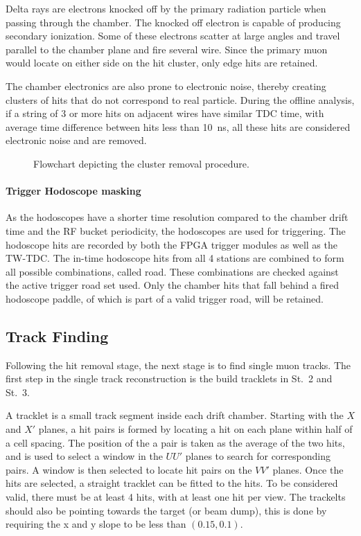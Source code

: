 \documentclass[../main.tex]{subfiles}
\begin{document}
Delta rays are electrons knocked off by the primary radiation particle when passing
through the chamber. The knocked off electron is capable of producing secondary ionization.
Some of these electrons scatter at large angles and travel parallel to the chamber plane
and fire several wire. Since the primary muon would locate on either side on the hit cluster,
only edge hits are retained.

The chamber electronics are also prone to electronic noise, thereby creating clusters of
hits that do not correspond to real particle. During the offline analysis, if a string of
3 or more hits on adjacent wires have similar TDC time, with average time difference between
hits less than \SI{10}{\ns}, all these hits are considered electronic noise and are removed.

\begin{figure}
	\centering
	
	\caption{Flowchart depicting the cluster removal procedure.}
\end{figure}

\paragraph{Trigger Hodoscope masking}
As the hodoscopes have a shorter time resolution compared to the chamber drift time and
the RF bucket periodicity, the hodoscopes are used for triggering. The hodoscope hits
are recorded by both the FPGA trigger modules as well as the TW-TDC. The in-time hodoscope
hits from all 4 stations are combined to form all possible combinations, called road. These
combinations are checked against the active trigger road set used. Only the chamber hits
that fall behind a fired hodoscope paddle, of which is part of a valid trigger road, will be retained.


\subsection{Track Finding}
Following the hit removal stage, the next stage is to find single muon tracks.
The first step in the single track reconstruction is the build tracklets in St.~2 and St.~3.

A tracklet is a small track segment inside each drift chamber. Starting with the $X$ and
$X'$ planes, a hit pairs is formed by locating a hit on each plane within half of a cell spacing.
The position of the a pair is taken as the average of the two hits, and is used to select a window
in the $UU'$ planes to search for corresponding pairs. A window is then selected to locate hit pairs
on the $VV'$ planes. Once the hits are selected, a straight tracklet can be fitted to the hits.
To be considered valid, there must be at least 4 hits, with at least one hit per view. The trackelts
should also be pointing towards the target (or beam dump), this is done by requiring the x and y slope to be
less than $(0.15,0.1)$.
\end{document}
